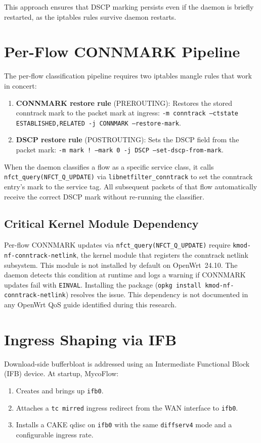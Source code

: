 This approach ensures that DSCP marking persists even if the daemon is briefly restarted, as the iptables rules survive daemon restarts.

\section{Per-Flow CONNMARK Pipeline}

The per-flow classification pipeline requires two iptables mangle rules that work in concert:

\begin{enumerate}
  \item \textbf{CONNMARK restore rule} (PREROUTING): Restores the stored conntrack mark to the packet mark at ingress: \texttt{-m conntrack --ctstate ESTABLISHED,RELATED -j CONNMARK --restore-mark}.
  \item \textbf{DSCP restore rule} (POSTROUTING): Sets the DSCP field from the packet mark: \texttt{-m mark ! --mark 0 -j DSCP --set-dscp-from-mark}.
\end{enumerate}

When the daemon classifies a flow as a specific service class, it calls \texttt{nfct\_query(NFCT\_Q\_UPDATE)} via \texttt{libnetfilter\_conntrack} to set the conntrack entry's mark to the service tag. All subsequent packets of that flow automatically receive the correct DSCP mark without re-running the classifier.

\subsection{Critical Kernel Module Dependency}

Per-flow CONNMARK updates via \texttt{nfct\_query(NFCT\_Q\_UPDATE)} require \texttt{kmod-nf-conntrack-netlink}, the kernel module that registers the conntrack netlink subsystem. This module is not installed by default on OpenWrt~24.10. The daemon detects this condition at runtime and logs a warning if CONNMARK updates fail with \texttt{EINVAL}. Installing the package (\texttt{opkg install kmod-nf-conntrack-netlink}) resolves the issue. This dependency is not documented in any OpenWrt QoS guide identified during this research.

\section{Ingress Shaping via IFB}

Download-side bufferbloat is addressed using an Intermediate Functional Block (IFB) device. At startup, MycoFlow:
\begin{enumerate}
  \item Creates and brings up \texttt{ifb0}.
  \item Attaches a \texttt{tc mirred} ingress redirect from the WAN interface to \texttt{ifb0}.
  \item Installs a CAKE qdisc on \texttt{ifb0} with the same \texttt{diffserv4} mode and a configurable ingress rate.
\end{enumerate}

